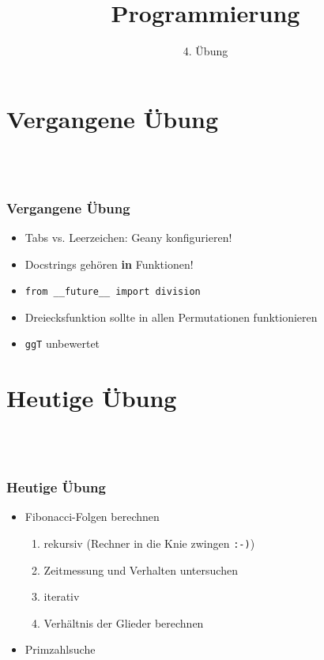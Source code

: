 
\title{Programmierung}
\subtitle{4. Übung}

\newcommand{\s}{\textvisiblespace}
\newcommand{\bs}{\s\s\s\s}


    \begin{frame}
        \frontframe
    \end{frame}

    \section{Vergangene Übung}
    \subsection{~}

    \begin{frame}
        \frametitle{Vergangene Übung}
        \begin{itemize}
        \item Tabs vs. Leerzeichen: Geany konfigurieren!
        \pause
        \item Docstrings gehören \textbf{in} Funktionen!
        \pause
        \item \texttt{from \_\_future\_\_ import division}
        \pause
        \item Dreiecksfunktion sollte in allen Permutationen funktionieren
        \pause
        \item \texttt{ggT} unbewertet
        \end{itemize}
    \end{frame}

    \section{Heutige Übung}
    \subsection{~}

    \begin{frame}
        \frametitle{Heutige Übung}
        \begin{itemize}
        \item Fibonacci-Folgen berechnen
            \begin{enumerate}
            \item rekursiv {\tiny(Rechner in die Knie zwingen \texttt{:-)})}
            \item Zeitmessung und Verhalten untersuchen
            \item iterativ
            \item Verhältnis der Glieder berechnen
            \end{enumerate}
        \item Primzahlsuche
        \end{itemize}
    \end{frame}

